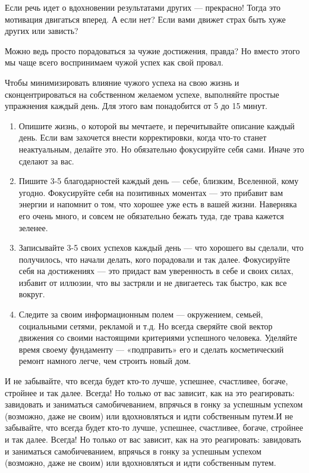 \begin{fancyquotes}
    Если речь идет о вдохновении результатами других — прекрасно! Тогда это мотивация двигаться вперед. А если нет? Если вами движет страх быть хуже других или зависть?
\end{fancyquotes}

Можно ведь просто порадоваться за чужие достижения, правда? Но вместо этого мы чаще всего воспринимаем чужой успех как свой провал.

Чтобы минимизировать влияние чужого успеха на свою жизнь и сконцентрироваться на собственном желаемом успехе, выполняйте простые упражнения каждый день. Для этого вам понадобится от 5 до 15 минут.


\begin{enumerate}
    \item Опишите жизнь, о которой вы мечтаете, и перечитывайте описание каждый день. Если вам захочется внести корректировки, когда что-то станет неактуальным, делайте это. Но обязательно фокусируйте себя сами. Иначе это сделают за вас.
    \item Пишите 3-5 благодарностей каждый день — себе, близким, Вселенной, кому угодно. Фокусируйте себя на позитивных моментах — это прибавит вам энергии и напомнит о том, что хорошее уже есть в вашей жизни. Наверняка его очень много, и совсем не обязательно бежать туда, где трава кажется зеленее.
    \item Записывайте 3-5 своих успехов каждый день — что хорошего вы сделали, что получилось, что начали делать, кого порадовали и так далее. Фокусируйте себя на достижениях — это придаст вам уверенность в себе и своих силах, избавит от иллюзии, что вы застряли и не двигаетесь так быстро, как все вокруг.
    \item Следите за своим информационным полем — окружением, семьей, социальными сетями, рекламой и т.д. Но всегда сверяйте свой вектор движения со своими настоящими критериями успешного человека. Уделяйте время своему фундаменту — «подправить» его и сделать косметический ремонт намного легче, чем строить новый дом.
\end{enumerate}

И не забывайте, что всегда будет кто-то лучше, успешнее, счастливее, богаче, стройнее и так далее. Всегда! Но только от вас зависит, как на это реагировать: завидовать и заниматься самобичеванием, впрячься в гонку за успешным успехом (возможно, даже не своим) или вдохновляться и идти собственным путем.И не забывайте, что всегда будет кто-то лучше, успешнее, счастливее, богаче, стройнее и так далее. Всегда! Но только от вас зависит, как на это реагировать: завидовать и заниматься самобичеванием, впрячься в гонку за успешным успехом (возможно, даже не своим) или вдохновляться и идти собственным путем.